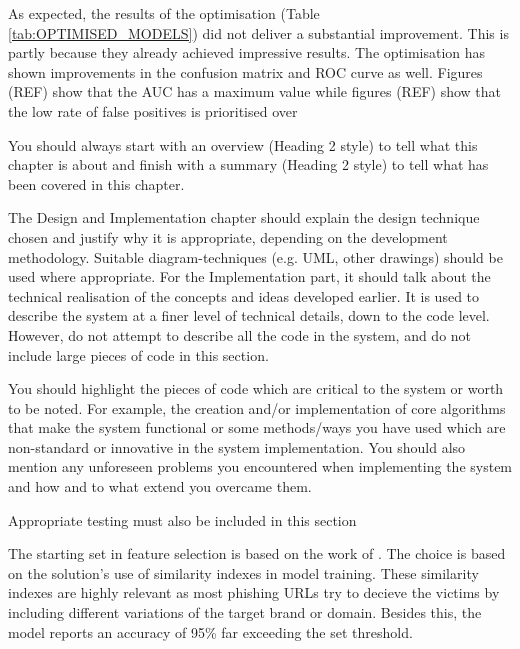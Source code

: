 As expected, the results of the optimisation (Table \ref{tab:OPTIMISED_MODELS}) did not deliver a substantial improvement. This is partly because they already achieved impressive results. The optimisation has shown improvements in the confusion matrix and ROC curve as well. Figures (REF) show that the AUC has a maximum value while figures (REF) show that the low rate of false positives is prioritised over 













\iffalse
	You should always start with an overview (Heading 2 style) to tell what this chapter is about and finish with a summary (Heading 2 style) to tell what has been covered in this chapter.

	The Design and Implementation chapter should explain the design technique chosen and justify why it is appropriate, depending on the development methodology.  Suitable diagram-techniques (e.g. UML, other drawings) should be used where appropriate. For the Implementation part, it should talk about the technical realisation of the concepts and ideas developed earlier. It is used to describe the system at a finer level of technical details, down to the code level. However, do not attempt to describe all the code in the system, and do not include large pieces of code in this section.

	You should highlight the pieces of code which are critical to the system or worth to be noted. For example, the creation and/or implementation of core algorithms that make the system functional or some methods/ways you have used which are non-standard or innovative in the system implementation. You should also mention any unforeseen problems you encountered when implementing the system and how and to what extend you overcame them.

	Appropriate testing must also be included in this section







	The starting set in feature selection is based on the work of \cite{SVM_SIMILARITY_INDEX}. The choice is based on the solution's use of similarity indexes in model training. These similarity indexes are highly relevant as most phishing URLs try to decieve the victims by including different variations of the target brand or domain. Besides this, the model reports an accuracy of 95\% far exceeding the set threshold.

